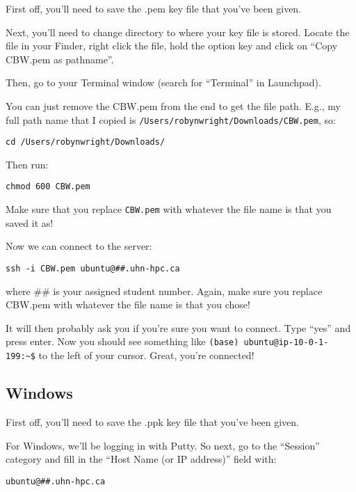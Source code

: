 \documentclass[
]{book}
\begin{document}
First off, you'll need to save the .pem key file that you've been given.

Next, you'll need to change directory to where your key file is stored. Locate the file in your Finder, right click the file, hold the option key and click on ``Copy CBW.pem as pathname''.

Then, go to your Terminal window (search for ``Terminal'' in Launchpad).

You can just remove the CBW.pem from the end to get the file path. E.g., my full path name that I copied is \texttt{/Users/robynwright/Downloads/CBW.pem}, so:

\begin{verbatim}
cd /Users/robynwright/Downloads/
\end{verbatim}

Then run:

\begin{verbatim}
chmod 600 CBW.pem
\end{verbatim}

Make sure that you replace \texttt{CBW.pem} with whatever the file name is that you saved it as!

Now we can connect to the server:

\begin{verbatim}
ssh -i CBW.pem ubuntu@##.uhn-hpc.ca
\end{verbatim}

where \#\# is your assigned student number. Again, make sure you replace CBW.pem with whatever the file name is that you chose!

It will then probably ask you if you're sure you want to connect. Type ``yes'' and press enter. Now you should see something like \texttt{(base)\ ubuntu@ip-10-0-1-199:\textasciitilde{}\$} to the left of your cursor. Great, you're connected!

\subsection{Windows}\label{windows}

First off, you'll need to save the .ppk key file that you've been given.

For Windows, we'll be logging in with Putty. So next, go to the ``Session'' category and fill in the ``Host Name (or IP address)'' field with:

\begin{verbatim}
ubuntu@##.uhn-hpc.ca
\end{verbatim}
\end{document}

